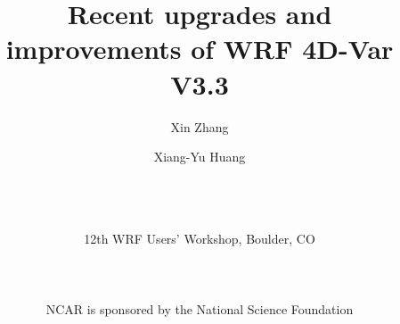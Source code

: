 \documentclass{beamer}
\title[Upgrades of WRF 4D-Var V3.3]{Recent upgrades and improvements of WRF 4D-Var V3.3}
\author[Zhang and Huang]{Xin Zhang \and
Xiang-Yu Huang}
\date{~\\
~\\
~\\\tiny{12th WRF Users' Workshop, Boulder, CO}\\
  ~\\
  ~\\
  ~\\
 \tiny{NCAR is sponsored by the National Science Foundation}
}
\institute[NCAR Earth System Laboratory]{
   NCAR Earth System Laboratory \\
}
\newcommand{\fst}[2]{\subsection{#1}\frame{\frametitle{#1} #2}}
\begin{document}
\frame{\titlepage}

\end{document}
